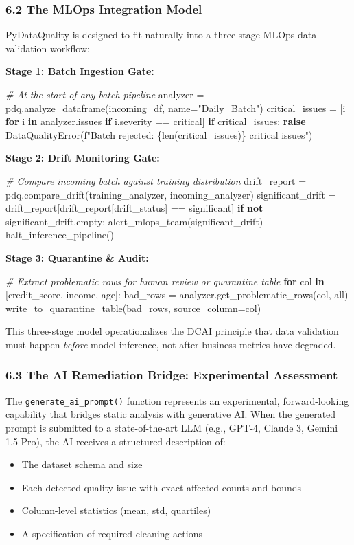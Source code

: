 \documentclass{article}
\begin{document}
\subsubsection{6.2 The MLOps Integration
Model}\label{the-mlops-integration-model}

PyDataQuality is designed to fit naturally into a three-stage MLOps data
validation workflow:

\textbf{Stage 1: Batch Ingestion Gate:}

\emph{\# At the start of any batch pipeline} analyzer =
pdq.analyze\_dataframe(incoming\_df, name="Daily\_Batch")
critical\_issues = {[}i \textbf{for} i \textbf{in} analyzer.issues
\textbf{if} i.severity == critical{]} \textbf{if} critical\_issues:
\textbf{raise} DataQualityError(f"Batch rejected:
\{len(critical\_issues)\} critical issues")

\textbf{Stage 2: Drift Monitoring Gate:}

\emph{\# Compare incoming batch against training distribution}
drift\_report = pdq.compare\_drift(training\_analyzer,
incoming\_analyzer) significant\_drift =
drift\_report{[}drift\_report{[}drift\_status{]} == significant{]}
\textbf{if} \textbf{not} significant\_drift.empty:
alert\_mlops\_team(significant\_drift) halt\_inference\_pipeline()

\textbf{Stage 3: Quarantine \& Audit:}

\emph{\# Extract problematic rows for human review or quarantine table}
\textbf{for} col \textbf{in} {[}credit\_score, income, age{]}: bad\_rows
= analyzer.get\_problematic\_rows(col, all)
write\_to\_quarantine\_table(bad\_rows, source\_column=col)

This three-stage model operationalizes the DCAI principle that data
validation must happen \emph{before} model inference, not after business
metrics have degraded.

\subsubsection{6.3 The AI Remediation Bridge: Experimental
Assessment}\label{the-ai-remediation-bridge-experimental-assessment}

The \texttt{generate\_ai\_prompt()} function represents an experimental,
forward-looking capability that bridges static analysis with generative
AI. When the generated prompt is submitted to a state-of-the-art LLM
(e.g., GPT-4, Claude 3, Gemini 1.5 Pro), the AI receives a structured
description of:

\begin{itemize}
\item
  The dataset schema and size
\item
  Each detected quality issue with exact affected counts and bounds
\item
  Column-level statistics (mean, std, quartiles)
\item
  A specification of required cleaning actions
\end{itemize}
\end{document}
